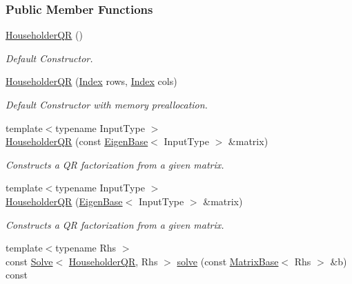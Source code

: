 \subsubsection*{Public Member Functions}
\begin{DoxyCompactItemize}
\item 
\hyperlink{group___q_r___module_a974adb10a0e066057aeb3b360df68380}{Householder\+QR} ()
\begin{DoxyCompactList}\small\item\em Default Constructor. \end{DoxyCompactList}\item 
\hyperlink{group___q_r___module_a1087457610c53e1574de521a51de0cd3}{Householder\+QR} (\hyperlink{namespace_eigen_a62e77e0933482dafde8fe197d9a2cfde}{Index} rows, \hyperlink{namespace_eigen_a62e77e0933482dafde8fe197d9a2cfde}{Index} cols)
\begin{DoxyCompactList}\small\item\em Default Constructor with memory preallocation. \end{DoxyCompactList}\item 
{\footnotesize template$<$typename Input\+Type $>$ }\\\hyperlink{group___q_r___module_afa7cfb4faa89195c4dc8d196924c8230}{Householder\+QR} (const \hyperlink{group___core___module_struct_eigen_1_1_eigen_base}{Eigen\+Base}$<$ Input\+Type $>$ \&matrix)
\begin{DoxyCompactList}\small\item\em Constructs a QR factorization from a given matrix. \end{DoxyCompactList}\item 
{\footnotesize template$<$typename Input\+Type $>$ }\\\hyperlink{group___q_r___module_a95a53f8479ee147d7b0ccab71c13e45d}{Householder\+QR} (\hyperlink{group___core___module_struct_eigen_1_1_eigen_base}{Eigen\+Base}$<$ Input\+Type $>$ \&matrix)
\begin{DoxyCompactList}\small\item\em Constructs a QR factorization from a given matrix. \end{DoxyCompactList}\item 
{\footnotesize template$<$typename Rhs $>$ }\\const \hyperlink{group___core___module_class_eigen_1_1_solve}{Solve}$<$ \hyperlink{group___q_r___module_class_eigen_1_1_householder_q_r}{Householder\+QR}, Rhs $>$ \hyperlink{group___q_r___module_a3e8e56769bbaaed0616ad98c4ff99c7b}{solve} (const \hyperlink{group___core___module_class_eigen_1_1_matrix_base}{Matrix\+Base}$<$ Rhs $>$ \&b) const

\end{DoxyCompactItemize}
